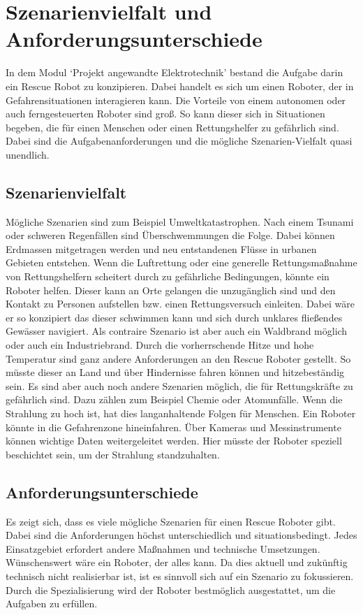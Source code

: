 \section{Szenarienvielfalt und Anforderungsunterschiede}

In dem Modul `Projekt angewandte Elektrotechnik' bestand die Aufgabe darin ein Rescue Robot zu konzipieren.
Dabei handelt es sich um einen Roboter, der in Gefahrensituationen interagieren kann. 
Die Vorteile von einem autonomen oder auch ferngesteuerten Roboter sind groß. So kann dieser sich in Situationen begeben, die für einen Menschen oder einen Rettungshelfer zu gefährlich sind. Dabei sind die Aufgabenanforderungen und die mögliche Szenarien-Vielfalt quasi unendlich. 

\subsection {Szenarienvielfalt}
Mögliche Szenarien sind zum Beispiel Umweltkatastrophen. 
Nach einem Tsunami oder schweren Regenfällen sind Überschwemmungen die Folge.
Dabei können Erdmassen mitgetragen werden und neu entstandenen Flüsse in urbanen Gebieten entstehen. 
Wenn die Luftrettung oder eine generelle Rettungsmaßnahme von Rettungshelfern scheitert durch zu gefährliche Bedingungen, könnte ein Roboter helfen. 
Dieser kann an Orte gelangen die unzugänglich sind und den Kontakt zu Personen aufstellen bzw. einen Rettungsversuch einleiten. 
Dabei wäre er so konzipiert das dieser schwimmen kann und sich durch unklares fließendes Gewässer navigiert. 
Als contraire Szenario ist aber auch ein Waldbrand möglich oder auch ein Industriebrand.
Durch die vorherrschende Hitze und hohe Temperatur sind ganz andere Anforderungen an den Rescue Roboter gestellt. 
So müsste dieser an Land und über Hindernisse fahren können und hitzebeständig sein. 
Es sind aber auch noch andere Szenarien möglich, die für Rettungskräfte zu gefährlich sind. 
Dazu zählen zum Beispiel Chemie oder Atomunfälle. Wenn die Strahlung zu hoch ist, hat dies langanhaltende Folgen für Menschen.
Ein Roboter könnte in die Gefahrenzone hineinfahren. 
Über Kameras und Messinstrumente können wichtige Daten weitergeleitet werden. 
Hier müsste der Roboter speziell beschichtet sein, um der Strahlung standzuhalten. 

\subsection {Anforderungsunterschiede}
Es zeigt sich, dass es viele mögliche Szenarien für einen Rescue Roboter gibt. 
Dabei sind die Anforderungen höchst unterschiedlich und situationsbedingt. 
Jedes Einsatzgebiet erfordert andere Maßnahmen und technische Umsetzungen. 
Wünschenswert wäre ein Roboter, der alles kann. Da dies aktuell und zukünftig technisch nicht realisierbar ist, ist es sinnvoll sich auf ein Szenario zu fokussieren.
Durch die Spezialisierung wird der Roboter bestmöglich ausgestattet, um die Aufgaben zu erfüllen.






